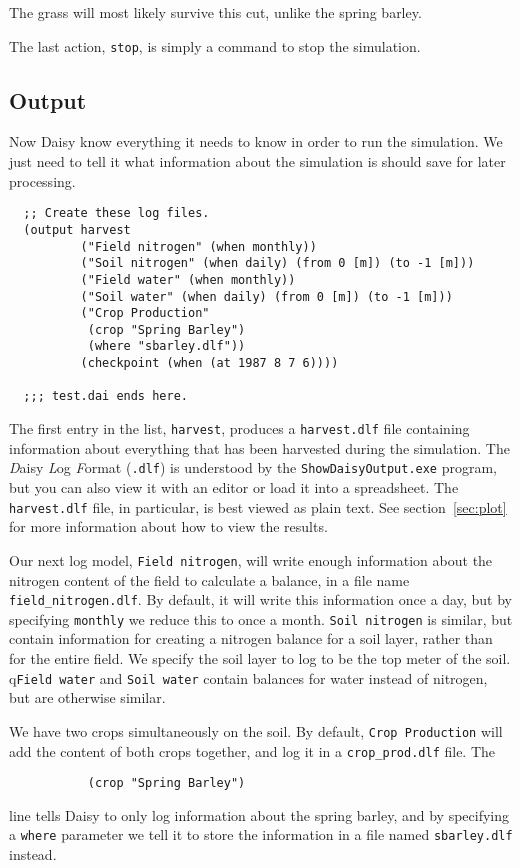 \documentclass[a4paper]{article}
\begin{document}
The grass will most likely survive this cut, unlike the spring barley.

The last action, \texttt{stop}, is simply a command to stop the
simulation.

\subsection{Output}
\label{ex:output}

Now Daisy know everything it needs to know in order to run the
simulation.  We just need to tell it what information about the
simulation is should save for later processing.

\begin{verbatim}
  ;; Create these log files.
  (output harvest
          ("Field nitrogen" (when monthly))
          ("Soil nitrogen" (when daily) (from 0 [m]) (to -1 [m]))
          ("Field water" (when monthly))
          ("Soil water" (when daily) (from 0 [m]) (to -1 [m]))
          ("Crop Production"
           (crop "Spring Barley")
           (where "sbarley.dlf"))
          (checkpoint (when (at 1987 8 7 6))))

  ;;; test.dai ends here.
\end{verbatim}

The first entry in the list, \texttt{harvest}, produces a
\texttt{harvest.dlf} file containing information about everything that
has been harvested during the simulation.  The \emph{D}aisy \emph{L}og
\emph{F}ormat (\texttt{.dlf}) is understood by the
\texttt{ShowDaisyOutput.exe} program, but you can also view it with an
editor or load it into a spreadsheet.  The \texttt{harvest.dlf} file,
in particular, is best viewed as plain text.  See
section~\ref{sec:plot} for more information about how to view the results.

Our next log model, \texttt{Field nitrogen}, will write enough
information about the nitrogen content of the field to calculate a
balance, in a file name \verb|field_nitrogen.dlf|.  By default, it
will write this information once a day, but by specifying
\texttt{monthly} we reduce this to once a month.  \texttt{Soil
  nitrogen} is similar, but contain information for creating a
nitrogen balance for a soil layer, rather than for the entire field.
We specify the soil layer to log to be the top meter of the soil.
q\texttt{Field water} and \texttt{Soil water} contain balances for
water instead of nitrogen, but are otherwise similar.

We have two crops simultaneously on the soil.  By default,
\texttt{Crop~Production} will add the content of both crops together,
and log it in a \texttt{crop\_prod.dlf} file.  The 
\begin{verbatim}
           (crop "Spring Barley")
\end{verbatim}
line tells Daisy to only log information about the spring barley,
and by specifying a \texttt{where} parameter we tell it to store the
information in a file named \texttt{sbarley.dlf} instead.
\end{document}
